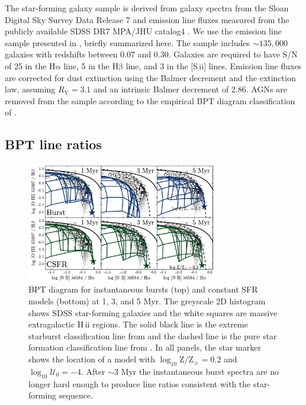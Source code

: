 \documentclass[linenumbers, tighten, trackchanges]{aastex61}%
\newcommand{\logten}{\ensuremath{\log_{10}}}
\newcommand{\sii}{[S\,{\sc ii}]\xspace}
\newcommand{\ha}{\ensuremath{\mathrm{H\alpha}}}
\newcommand{\hb}{\ensuremath{\mathrm{H\beta}}}
\newcommand{\hii}{H\,{\sc ii}\xspace}
\newcommand{\logZeq}[1]{\ensuremath{\logten \mathrm{Z}/\mathrm{Z}_{\sun} = #1}}
\newcommand{\logU}{\ensuremath{\logten \mathcal{U}_0}}
\begin{document}
The star-forming galaxy sample is derived from galaxy spectra from the Sloan Digital Sky Survey Data Release 7 \citep[SDSS DR7;][]{York00, Abazajian09} and emission line fluxes measured from the publicly available SDSS DR7 MPA/JHU catalog4 \citep{Kauffmann03a, Brinchmann04, Salim07}. We use the emission line sample presented in \citet{Telford16}, briefly summarized here. The sample includes $\sim 135,000$ galaxies with redshifts between 0.07 and 0.30. Galaxies are required to have S/N of 25 in the \ha{} line, 5 in the \hb{} line, and 3 in the \sii{} lines. Emission line fluxes are corrected for dust extinction using the Balmer decrement and the \citet{Cardelli89} extinction law, assuming $R_{\mathrm{V}} = 3.1$ and an intrinsic Balmer decrement of 2.86. AGNs are removed from the sample according to the empirical BPT diagram classification of \citet{Kauffmann03b}.

\subsection{BPT line ratios}\label{sec:models:diagnostics:BPT}
\begin{figure}[!htbp]
    \begin{centering}
        \includegraphics[width=0.75\textwidth]{f17.pdf}
        \caption{BPT diagram for instantaneous bursts (top) and constant SFR models (bottom) at 1, 3, and 5 Myr. The greyscale 2D histogram shows SDSS star-forming galaxies and the white squares are massive extragalactic \hii regions. The solid black line is the extreme starburst classification line from \citet{Kewley01} and the dashed line is the pure star formation classification line from \citet{Kauffmann03a}. In all panels, the star marker shows the location of a model with \logZeq{0.2} and $\logU=-4$. After $\sim3$ Myr the instantaneous burst spectra are no longer hard enough to produce line ratios consistent with the star-forming sequence.}
        \label{fig:BPTage}
    \end{centering}
\end{figure}
\end{document}
